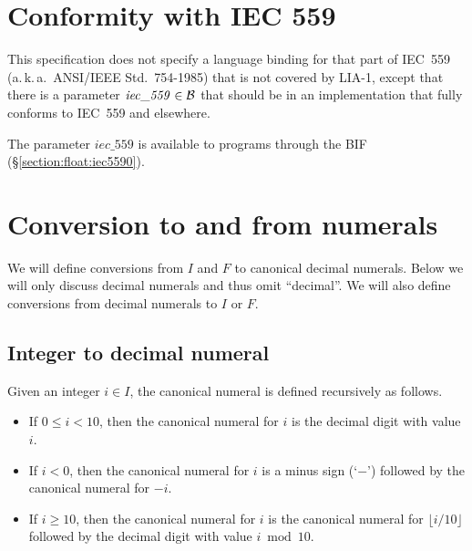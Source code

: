 \iffalse
\section{Translation}

\index{arithmetic!translation|(}
\emph{In this section I will tell how arithmetic expressions are expected to
be translated into combinations of LIA-1 operations.  Pretty easy since there
is only one integer and one float type.  The dynamic typing might make it
a little more messy.}
\index{arithmetic!translation|)}
\fi

\ifStd
\section{Conformity with IEC 559}

\label{section:arith-iec559}

This specification does not specify a language binding for that part
of IEC~559 (a.\,k.\,a.\ ANSI/IEEE Std.\ 754-1985) \cite{iec559} that
is not covered by LIA-1, except that there is a parameter
$\mathit{iec\_559}\in\mathcal{B}$ that should be  in an
implementation that fully conforms to IEC~559 and  elsewhere.

The parameter $\mathit{iec\_559}$ is available to programs through the BIF \linebreak
{} (\S\ref{section:float:iec5590}).
\fi

\section{Conversion to and from numerals}

We will define conversions from $I$ and $F$ to canonical decimal numerals.
Below we will only discuss decimal numerals and thus omit ``decimal''.
We will also define conversions from decimal numerals to $I$ or $F$.

\subsection{Integer to decimal numeral}

\label{section:integer-to-numeral}
Given an integer $i\in I$, the canonical numeral is defined recursively as follows.
\begin{itemize}
\item If $0\leq i<10$, then the canonical numeral for $i$ is the decimal digit with value $i$.
\item If $i<0$, then the canonical numeral for $i$ is a minus sign (`$-$') followed by the
canonical numeral for $-i$.
\item If $i\geq10$, then the canonical numeral for $i$ is the canonical numeral
for $\lfloor i/10\rfloor$ followed by the decimal digit with value $i\bmod10$.
\end{itemize}

